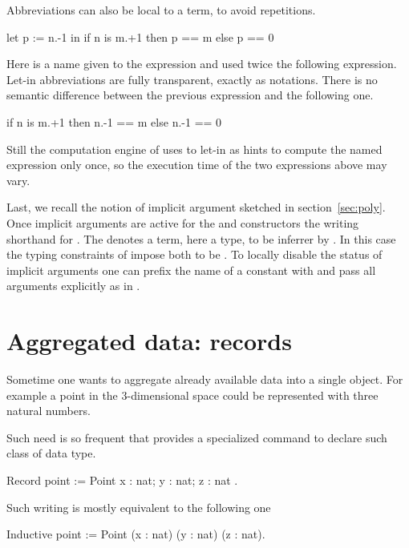 Abbreviations can also be local to a term, to avoid repetitions.

\begin{coq}{}{}
let p := n.-1 in
  if n is m.+1 then p == m else p == 0
\end{coq}
Here  is a name given to the expression  and
used twice the following expression.  Let-in abbreviations are
fully transparent, exactly as notations.  There is no semantic
difference between the previous expression and the following one.
\begin{coq}{}{}
  if n is m.+1 then n.-1 == m else n.-1 == 0
\end{coq}
Still the computation engine of \Coq{} uses to let-in as hints
to compute the named expression only once, so the execution time
of the two expressions above may vary.

Last, we recall the notion of implicit argument sketched in
section~\ref{sec:poly}.  Once implicit arguments are active for
the  and  constructors the writing  
shorthand for .  The \C{_} denotes a term,
here a type, to be inferrer by \Coq{}.  In this case the typing constraints
of impose both \C{_} to be .  To locally disable the
status of implicit arguments one can prefix the name of a
constant with  and pass all arguments explicitly as in
.

\section{Aggregated data: records}
\label{sec:records}

Sometime one wants to aggregate already available data into a single object.
For example a point in the 3-dimensional space could be represented with
three natural numbers.

Such need is so frequent that \Coq{} provides a specialized command
to declare such class of data type.

\begin{coq}{}{}
Record point := Point { x : nat; y : nat; z : nat }.
\end{coq}
Such writing is mostly equivalent to the following one

\begin{coq}{}{}
Inductive point := Point (x : nat) (y : nat) (z : nat).
\end{coq}

